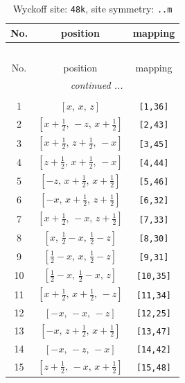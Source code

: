 \documentclass[fleqn,8pt]{jsarticle}
\begin{document}
\begin{longtable}{ccc}
\caption{Wyckoff site: {\tt 48k}, site symmetry: {\tt ..m}}
 \\
 \hline \hline
No. & position & mapping \\ \hline \endfirsthead

\multicolumn{2}{l}{\tablename\ \thetable{}} \\
 \hline \hline
No. & position & mapping \\ \hline \endhead

 \hline \hline
\multicolumn{2}{r}{\footnotesize\it continued ...} \\ \endfoot

 \hline \hline
\multicolumn{2}{r}{} \\ \endlastfoot

1 & $\left[ x,\, x,\, z \right]$ & {\tt [1,36]} \\ \hline
2 & $\left[ x + \frac{1}{2},\, - z,\, x + \frac{1}{2} \right]$ & {\tt [2,43]} \\ \hline
3 & $\left[ x + \frac{1}{2},\, z + \frac{1}{2},\, - x \right]$ & {\tt [3,45]} \\ \hline
4 & $\left[ z + \frac{1}{2},\, x + \frac{1}{2},\, - x \right]$ & {\tt [4,44]} \\ \hline
5 & $\left[ - z,\, x + \frac{1}{2},\, x + \frac{1}{2} \right]$ & {\tt [5,46]} \\ \hline
6 & $\left[ - x,\, x + \frac{1}{2},\, z + \frac{1}{2} \right]$ & {\tt [6,32]} \\ \hline
7 & $\left[ x + \frac{1}{2},\, - x,\, z + \frac{1}{2} \right]$ & {\tt [7,33]} \\ \hline
8 & $\left[ x,\, \frac{1}{2} - x,\, \frac{1}{2} - z \right]$ & {\tt [8,30]} \\ \hline
9 & $\left[ \frac{1}{2} - x,\, x,\, \frac{1}{2} - z \right]$ & {\tt [9,31]} \\ \hline
10 & $\left[ \frac{1}{2} - x,\, \frac{1}{2} - x,\, z \right]$ & {\tt [10,35]} \\ \hline
11 & $\left[ x + \frac{1}{2},\, x + \frac{1}{2},\, - z \right]$ & {\tt [11,34]} \\ \hline
12 & $\left[ - x,\, - x,\, - z \right]$ & {\tt [12,25]} \\ \hline
13 & $\left[ - x,\, z + \frac{1}{2},\, x + \frac{1}{2} \right]$ & {\tt [13,47]} \\ \hline
14 & $\left[ - x,\, - z,\, - x \right]$ & {\tt [14,42]} \\ \hline
15 & $\left[ z + \frac{1}{2},\, - x,\, x + \frac{1}{2} \right]$ & {\tt [15,48]} \\ \hline

\end{longtable}
\end{document}
